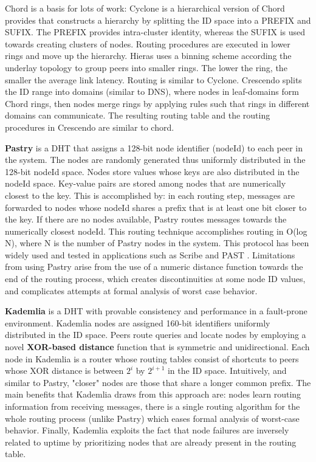 Chord is a basis for lots of work: Cyclone \cite{Artigas2005} is a hierarchical version of Chord provides that constructs a hierarchy by splitting the ID space into a PREFIX and SUFIX. The PREFIX provides intra-cluster identity, whereas the SUFIX is used towards creating clusters of nodes. Routing procedures are executed in lower rings and move up the hierarchy.  Hieras \cite{1240580} uses a binning scheme according the underlay topology to group peers into smaller rings. The lower the ring, the smaller the average link latency. Routing is similar to Cyclone. Crescendo \cite{Ganesan2004} splits the ID range into domains (similar to DNS), where nodes in leaf-domains form Chord rings, then nodes merge rings by applying rules such that rings in different domains can communicate. The resulting routing table and the routing procedures in Crescendo are similar to chord.

    
\textbf{Pastry} \cite{rowstron2001pastry} is a DHT that assigns a 128-bit node identifier (nodeId) to each peer in the system. The nodes are randomly generated thus uniformly distributed in the 128-bit nodeId space. Nodes store values whose keys are also distributed in the nodeId space. Key-value pairs are stored among nodes that are numerically closest to the key. This is accomplished by: in each routing step, messages are forwarded to nodes whose nodeId shares a prefix that is at least one bit closer to the key. If there are no nodes available, Pastry routes messages towards the numerically closest nodeId. This routing technique accomplishes routing in O(log N), where N is the number of Pastry nodes in the system. This protocol has been widely used and tested in applications such as Scribe \cite{10.1007/3-540-45546-9_3} and PAST \cite{990064}. Limitations from using Pastry arise from the use of a numeric distance function towards the end of the routing process, which creates discontinuities at some node ID values, and complicates attempts at formal analysis of worst case behavior.

\textbf{Kademlia} \cite{10.1007/3-540-45748-8_5} is a DHT with provable consistency and performance in a fault-prone environment. Kademlia nodes are assigned 160-bit identifiers uniformly distributed in the ID space. Peers route queries and locate nodes by employing a novel \textbf{XOR-based distance} function that is symmetric and unidirectional. Each node in Kademlia is a router whose routing tables consist of shortcuts to peers whose XOR distance is between \(2^{i}\) by \(2^{i + 1}\) in the ID space. Intuitively, and similar to Pastry, "closer" nodes are those that share a longer common prefix. The main benefits that Kademlia draws from this approach are: nodes learn routing information from receiving messages, there is a single routing algorithm for the whole routing process (unlike Pastry) which eases formal analysis of worst-case behavior. Finally, Kademlia exploits the fact that node failures are inversely related to uptime by prioritizing nodes that are already present in the routing table.

